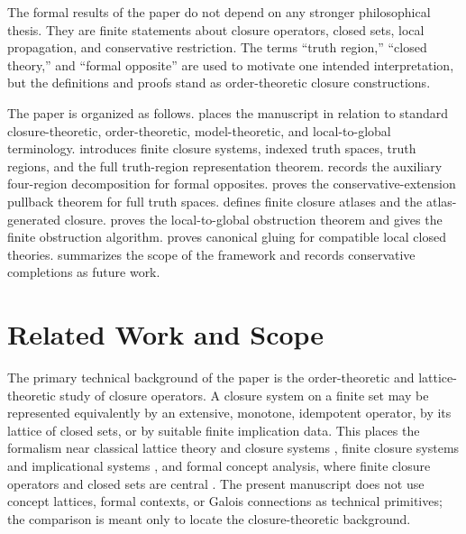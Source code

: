 \documentclass[11pt]{amsart}
\numberwithin{equation}{section}
\theoremstyle{plain}
\theoremstyle{definition}
\theoremstyle{remark}
\begin{document}
The formal results of the paper do not depend on any stronger philosophical thesis.  They are finite statements about closure operators, closed sets, local propagation, and conservative restriction.  The terms ``truth region,'' ``closed theory,'' and ``formal opposite'' are used to motivate one intended interpretation, but the definitions and proofs stand as order-theoretic closure constructions.

The paper is organized as follows.   places the manuscript in relation to standard closure-theoretic, order-theoretic, model-theoretic, and local-to-global terminology.   introduces finite closure systems, indexed truth spaces, truth regions, and the full truth-region representation theorem.   records the auxiliary four-region decomposition for formal opposites.   proves the conservative-extension pullback theorem for full truth spaces.   defines finite closure atlases and the atlas-generated closure.   proves the local-to-global obstruction theorem and gives the finite obstruction algorithm.   proves canonical gluing for compatible local closed theories.   summarizes the scope of the framework and records conservative completions as future work.


\section{Related Work and Scope}
\label{sec:related-work-scope}

The primary technical background of the paper is the order-theoretic and lattice-theoretic study of closure operators.  A closure system on a finite set may be represented equivalently by an extensive, monotone, idempotent operator, by its lattice of closed sets, or by suitable finite implication data.  This places the formalism near classical lattice theory and closure systems \cite{Birkhoff1967,DaveyPriestley2002}, finite closure systems and implicational systems \cite{GuiguesDuquenne1986,CaspardMonjardet2003,BertetDemkoViaudGuerin2018}, and formal concept analysis, where finite closure operators and closed sets are central \cite{GanterWille1999}.  The present manuscript does not use concept lattices, formal contexts, or Galois connections as technical primitives; the comparison is meant only to locate the closure-theoretic background.
\end{document}
